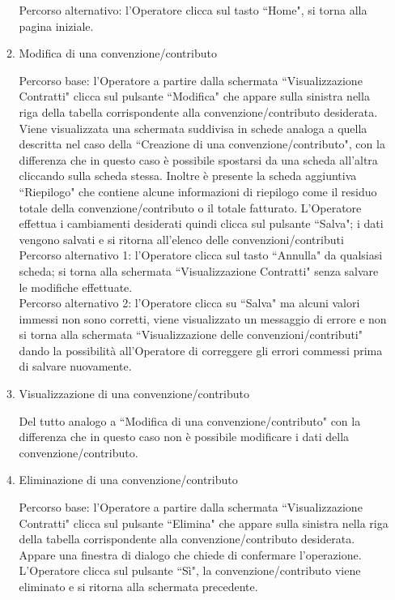 \begin{enumerate}
\begin{enumerate}
  Percorso alternativo:
  l'Operatore clicca sul tasto ``Home", si torna alla pagina iniziale.
 
  \item Modifica di una convenzione/contributo\\ \label{UC_edit_contract}
  
  Percorso base:
  l'Operatore a partire dalla schermata ``Visualizzazione Contratti" clicca sul pulsante ``Modifica" che appare sulla sinistra nella riga 
  della tabella corrispondente alla convenzione/contributo desiderata. Viene visualizzata una schermata suddivisa in schede analoga a quella
  descritta nel caso della ``Creazione di una convenzione/contributo", con la differenza che in questo caso è possibile spostarsi da una scheda all'altra
  cliccando sulla scheda stessa. Inoltre è presente la scheda aggiuntiva ``Riepilogo" che contiene alcune informazioni di riepilogo come il residuo
  totale della convenzione/contributo o il totale fatturato.
  L'Operatore effettua i cambiamenti desiderati quindi clicca sul pulsante ``Salva"; i dati vengono salvati e si ritorna all'elenco delle convenzioni/contributi\\

  Percorso alternativo 1:
  l'Operatore clicca sul tasto \textquotedblleft Annulla" da qualsiasi scheda;  si torna alla schermata \textquotedblleft Visualizzazione Contratti" senza salvare le modifiche effettuate.\\
  
  Percorso alternativo 2:
  l'Operatore clicca su \textquotedblleft Salva" ma alcuni valori immessi non sono corretti, viene visualizzato un messaggio di errore e non si torna alla schermata \textquotedblleft Visualizzazione delle
  convenzioni/contributi" dando la possibilità all'Operatore di correggere gli errori commessi prima di salvare nuovamente.
  
  \item Visualizzazione di una convenzione/contributo\\ \label{UC_view_contract}
 
  Del tutto analogo a ``Modifica di una convenzione/contributo" con la differenza che in questo caso non è possibile modificare i dati della
  convenzione/contributo.
  
  \item Eliminazione di una convenzione/contributo\\ \label{UC_delete_contract}
  
  Percorso base:
  l'Operatore a partire dalla schermata ``Visualizzazione Contratti" clicca sul pulsante ``Elimina" che appare sulla sinistra nella riga 
  della tabella corrispondente alla convenzione/contributo desiderata. Appare una finestra di dialogo che chiede di confermare l'operazione. L'Operatore clicca sul pulsante ``Sì", la convenzione/contributo viene eliminato e si
  ritorna alla schermata precedente.
  

\end{enumerate}
\end{enumerate}

